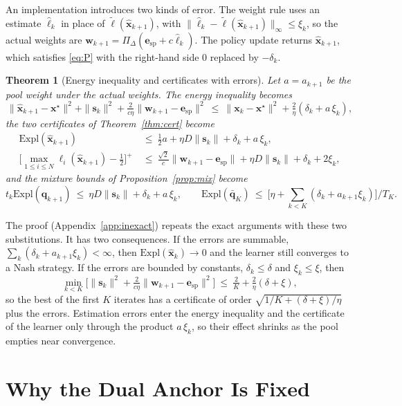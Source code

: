 \documentclass{article}
\theoremstyle{plain}
\newtheorem{theorem}{Theorem}[section]
\theoremstyle{remark}
\newcommand{\Expl}{\mathrm{Expl}}
\newcommand{\Proj}{\Pi}
\newcommand{\simplex}{\Delta}
\newcommand{\bx}{{\bm{x}}}
\newcommand{\bw}{{\bm{w}}}
\newcommand{\bq}{{\bm{q}}}
\newcommand{\be}{{\bm{e}}}
\newcommand{\bell}{{\bm{\ell}}}
\newcommand{\aug}{\tilde{\bell}}
\newcommand{\xs}{\bx^{\star}}
\newcommand{\dx}{{\bm{s}}}
\newcommand{\esp}{\be_{\mathrm{sp}}}
\begin{document}
An implementation introduces two kinds of error. The weight rule uses an estimate $\hat{\bell}_k$ in place of $\aug(\hat \bx_{k+1})$, with $\|\hat{\bell}_k-\aug(\hat \bx_{k+1})\|_\infty\le\xi_k$, so the actual weights are $\bw_{k+1}=\Proj_\simplex(\esp+c\hat{\bell}_k)$. The policy update returns $\hat \bx_{k+1}$, which satisfies \eqref{eq:P} with the right-hand side $0$ replaced by $-\delta_k$.
\begin{theorem}[Energy inequality and certificates with errors]
\label{thm:inexact}
Let $a=a_{k+1}$ be the pool weight under the actual weights. The energy inequality becomes
\[
\|\hat \bx_{k+1}-\xs\|^2+\|\dx_k\|^2+\tfrac{2}{c\eta}\|\bw_{k+1}-\esp\|^2\ \le\ \|\bx_k-\xs\|^2+\tfrac2\eta(\delta_k+a\,\xi_k),
\]
the two certificates of Theorem~\ref{thm:cert} become
\begin{align*}
\Expl(\hat \bx_{k+1})&\ \le\ \tfrac12a+\eta D\|\dx_k\|+\delta_k+a\,\xi_k,\\
\Big[\max_{1\le i\le N}\ell_i(\hat \bx_{k+1})-\tfrac12\Big]^+&\ \le\ \tfrac{\sqrt2}{c}\|\bw_{k+1}-\esp\|+\eta D\|\dx_k\|+\delta_k+2\xi_k,
\end{align*}
and the mixture bounds of Proposition~\ref{prop:mix} become
\[
t_k\Expl(\bq_{k+1})\ \le\ \eta D\|\dx_k\|+\delta_k+a\,\xi_k,\qquad
\Expl(\bar{\bq}_K)\ \le\ \Big[\eta+\textstyle\sum_{k<K}(\delta_k+a_{k+1}\xi_k)\Big]\big/T_K .
\]
\end{theorem}
The proof (Appendix~\ref{app:inexact}) repeats the exact arguments with these two substitutions. It has two consequences. If the errors are summable, $\sum_k(\delta_k+a_{k+1}\xi_k)<\infty$, then $\Expl(\hat\bx_k)\to0$ and the learner still converges to a Nash strategy. If the errors are bounded by constants, $\delta_k\le\delta$ and $\xi_k\le\xi$, then
\[
\min_{k<K}\Big[\|\dx_k\|^2+\tfrac{2}{c\eta}\|\bw_{k+1}-\esp\|^2\Big]\ \le\ \tfrac2K+\tfrac2\eta(\delta+\xi) ,
\]
so the best of the first $K$ iterates has a certificate of order $\sqrt{1/K+(\delta+\xi)/\eta}$ plus the errors. Estimation errors enter the energy inequality and the certificate of the learner only through the product $a\,\xi_k$, so their effect shrinks as the pool empties near convergence.

\section{Why the Dual Anchor Is Fixed}
\label{sec:coda}
\end{document}
